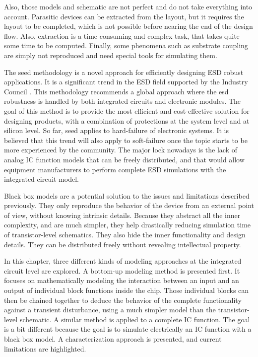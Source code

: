 Also, those models and schematic are not perfect and do not take everything into account.
Parasitic devices can be extracted from the layout, but it requires the layout to be completed, which is not possible before nearing the end of the design flow.
Also, extraction is a time consuming and complex task, that takes quite some time to be computed.
Finally, some phenomena such as substrate coupling are simply not reproduced and need special tools for simulating them.

The \gls{seed} methodology is a novel approach for efficiently designing ESD robust applications.
It is a significant trend in the ESD field supported by the Industry Council \cite{seed}.
This methodology recommends a global approach where the \gls{esd} robustness is handled by both integrated circuits and electronic modules.
The goal of this method is to provide the most efficient and cost-effective solution for designing products, with a combination of protections at the system level and at silicon level.
So far, \gls{seed} applies to hard-failure of electronic systems.
It is believed that this trend will also apply to soft-failure once the topic starts to be more experienced by the community.
The major lock nowadays is the lack of analog IC function models that can be freely distributed, and that would allow equipment manufacturers to perform complete ESD simulations with the integrated circuit model.

Black box models are a potential solution to the issues and limitations described previously.
They only reproduce the behavior of the device from an external point of view, without knowing intrinsic details.
Because they abstract all the inner complexity, and are much simpler, they help drastically reducing simulation time of transistor-level schematics.
They also hide the inner functionality and design details.
They can be distributed freely without revealing intellectual property.

In this chapter, three different kinds of modeling approaches at the integrated circuit level are explored.
A bottom-up modeling method is presented first.
It focuses on mathematically modeling the interaction between an input and an output of individual block functions inside the chip.
Those individual blocks can then be chained together to deduce the behavior of the complete functionality against a transient disturbance, using a much simpler model than the transistor-level schematic.
A similar method is applied to a complete IC function.
The goal is a bit different because the goal is to simulate electrically an IC function with a black box model.
A characterization approach is presented, and current limitations are highlighted.

